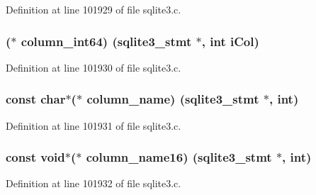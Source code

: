 Definition at line 101929 of file sqlite3.\+c.

\hypertarget{structsqlite3__api__routines_a1c8174b05fe17b5adf1f51410c2a7574}{}
\subsubsection[{column\+\_\+int64}]{($\ast$ column\+\_\+int64) ({\bf sqlite3\+\_\+stmt} $\ast$, int i\+Col)}\label{structsqlite3__api__routines_a1c8174b05fe17b5adf1f51410c2a7574}


Definition at line 101930 of file sqlite3.\+c.

\hypertarget{structsqlite3__api__routines_a1559513a2896c2f329ab535947d7b01a}{}
\subsubsection[{column\+\_\+name}]{\setlength{\rightskip}{0pt plus 5cm}const char$\ast$($\ast$ column\+\_\+name) ({\bf sqlite3\+\_\+stmt} $\ast$, int)}\label{structsqlite3__api__routines_a1559513a2896c2f329ab535947d7b01a}


Definition at line 101931 of file sqlite3.\+c.

\hypertarget{structsqlite3__api__routines_af02fc8b5183845a5cd23f865992f874b}{}
\subsubsection[{column\+\_\+name16}]{\setlength{\rightskip}{0pt plus 5cm}const void$\ast$($\ast$ column\+\_\+name16) ({\bf sqlite3\+\_\+stmt} $\ast$, int)}\label{structsqlite3__api__routines_af02fc8b5183845a5cd23f865992f874b}


Definition at line 101932 of file sqlite3.\+c.

\hypertarget{structsqlite3__api__routines_a73748d4fc1d34e9a147c1781667bd1c8}{}
